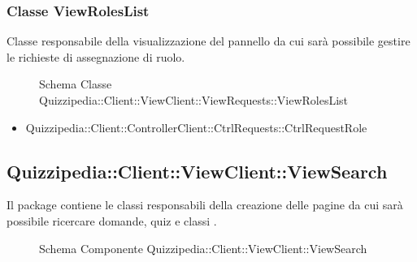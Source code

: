 \subsubsection{Classe ViewRolesList}
Classe responsabile della visualizzazione del pannello da cui sarà possibile gestire le richieste di assegnazione di ruolo.
\begin{figure}[H]
\centering
\noindent{}
\caption[Schema Classe ViewRolesList]{Schema Classe Quizzipedia::Client::ViewClient::ViewRequests::ViewRolesList}
\end{figure}
\begin{itemize}
\item Quizzipedia::Client::ControllerClient::CtrlRequests::CtrlRequestRole
\end{itemize}
\subsection{Quizzipedia::Client::ViewClient::ViewSearch}
Il package contiene le classi responsabili della creazione delle pagine da cui sarà possibile ricercare domande, quiz e classi .
\begin{figure}[H]
\centering
\noindent{}
\caption[Schema Componente Quizzipedia::Client::ViewClient::ViewSearch]{Schema Componente Quizzipedia::Client::ViewClient::ViewSearch}
\end{figure}
